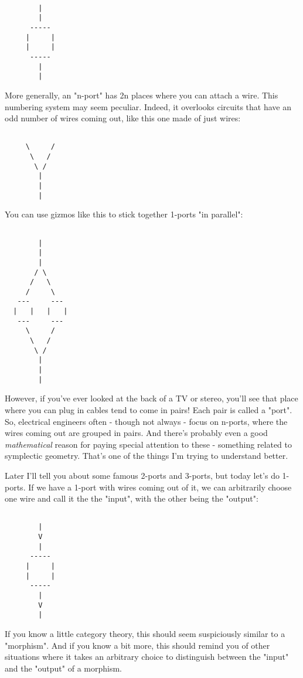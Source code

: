 \begin{verbatim}

        |
        |
      -----
     |     |
     |     |
      -----
        |
        |
\end{verbatim}
    

More generally, an "n-port" has 2n places where you can
attach a wire.  This numbering system may seem peculiar.  Indeed, it
overlooks circuits that have an odd number of wires coming out, like
this one made of just wires:


\begin{verbatim}

     \     /
      \   /
       \ /
        |
        |
        |
\end{verbatim}
    

You can use gizmos like this to stick together 1-ports 
"in parallel":



\begin{verbatim}

        |
        |
        |
       / \
      /   \
     /     \
   ---     ---
  |   |   |   |
   ---     ---
     \     /
      \   /
       \ /
        |
        |
        |
\end{verbatim}
    

However, if you've ever looked at the back of a TV or stereo, you'll
see that place where you can plug in cables tend to come in pairs!
Each pair is called a "port".  So, electrical engineers
often - though not always - focus on n-ports, where the wires coming
out are grouped in pairs.  And there's probably even a good
\emph{mathematical} reason for paying special attention to these -
something related to symplectic geometry.  That's one of the things
I'm trying to understand better.

Later I'll tell you about some famous 2-ports and 3-ports, but today
let's do 1-ports.  If we have a 1-port with wires coming out of it, we
can arbitrarily choose one wire and call it the the "input",
with the other being the "output":


\begin{verbatim}

        |
        V
        |
      -----
     |     |
     |     |
      -----
        |
        V
        |
\end{verbatim}
    
If you know a little category theory, this should seem suspiciously
similar to a "morphism".  And if you know a bit more, this
should remind you of other situations where it takes an arbitrary
choice to distinguish between the "input" and the
"output" of a morphism.

